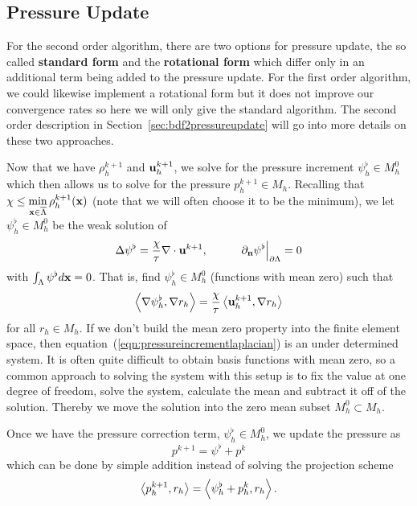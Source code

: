 \documentclass[letterpaper]{erdc}
\begin{document}
%
%
\subsection{Pressure Update}\label{sec:bdf1pressureupdate}
\begin{remark}
For the second order algorithm, there are two options for pressure update, the so called \textbf{standard form} and the \textbf{rotational form} which differ only in an additional term being added to the pressure update.  For the first order algorithm, we could likewise implement a rotational form but it does not improve our convergence rates so here we will only give the standard algorithm.  The second order description in Section~\ref{sec:bdf2pressureupdate} will go into more details on these two approaches.
\end{remark}

Now that we have $\rho_h^{k+1}$ and $\textbf{u}_h^{k+1}$, we solve for the pressure increment $\psi_h^{\flat}\in M_h^0$ which then allows us to solve for the pressure $p_h^{k+1}\in M_h$.  
Recalling that $\chi \leq \displaystyle\min_{\textbf{x}\in\overline{\Lambda}} \rho_h^{k+1}(\textbf{x})$ (note that we will often choose it to be the minimum), we let $\psi_h^{\flat}\in M^0_h$ be the weak solution of
\begin{equation}\label{eqn:pressureincrementlaplacian}
  \Delta \psi^{\flat} = \frac{\chi}{\tau}\nabla\cdot \textbf{u}^{k+1}, \hspace{1cm} \left.\partial_{\textbf{n}}\psi^{\flat}\right|_{\partial\Lambda} = 0
\end{equation}
with $\int_{\Lambda} \psi^{\flat} d\textbf{x} = 0$.  That is, find $\psi_h^{\flat}\in M_h^0$ (functions with mean zero) such that
\begin{equation}
  \left\langle \nabla\psi_h^{\flat}, \nabla r_h \right\rangle = \frac{\chi}{\tau}\left\langle \textbf{u}_h^{k+1}, \nabla r_h \right\rangle
\end{equation}
for all $r_h \in M_h$.  If we don't build the mean zero property into the finite element space, then equation~(\ref{eqn:pressureincrementlaplacian}) is an under determined system.  It is often quite difficult to obtain basis functions with mean zero, so a common approach to solving the system with this setup is to fix the value at one degree of freedom, solve the system, calculate the mean and subtract it off of the solution.  Thereby we move the solution into the zero mean subset $M_h^0\subset M_h$. 

 Once we have the pressure correction term, $\psi^{\flat}_h\in M_h^0$, we update the pressure as
\begin{equation}\label{eqn:rotationalpressureupdate}
  p^{k+1} = \psi^{\flat} + p^{k}
\end{equation}
which can be done by simple addition instead of solving the projection scheme 
\begin{equation}
  \left\langle p_h^{k+1}, r_h \right\rangle = \left\langle \psi_h^{\flat} + p_h^{k}, r_h \right\rangle.
\end{equation}
\end{document}
